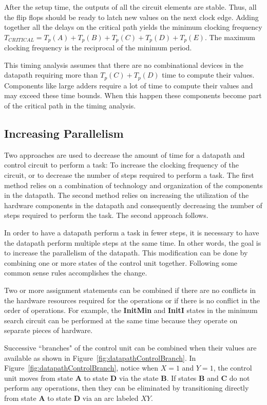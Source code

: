 After the setup time, the outputs of all the circuit elements 
are stable.  Thus, all the flip flops should be ready to latch new 
values on the next clock edge.  Adding together all the
delays on the critical path yields the minimum clocking frequency
$T_{CRITICAL}=T_p(A)+T_p(B)+T_p(C)+T_p(D)+T_p(E)$. The maximum
clocking frequency is the reciprocal of the minimum period.

This timing analysis assumes that there are no combinational devices in 
the datapath requiring more than $T_p(C)+T_p(D)$ time to compute their 
values.  Components like large adders require a lot of time to compute
their values and may exceed these time bounds.  When this happen these 
components become part of the critical path in the timing analysis.

\subsection{Increasing Parallelism}

Two approaches are used to decrease the amount of time for a 
datapath and control circuit to perform a task: To increase 
the clocking frequency of the circuit, or to decrease the number of
steps required to perform a task.  The first method relies on a
combination of technology and organization of the components in 
the datapath.  The second method relies on increasing the utilization 
of the hardware components in the datapath and consequently decreasing
the number of steps required to perform the task.  
The second approach follows.

In order to have a datapath perform a task in fewer steps, it is
necessary to have the datapath perform multiple steps at the 
same time.  In other words, the goal is to increase the
parallelism of the datapath.  This modification can be done by combining
one or more states of the control unit together.   
Following some common sense rules accomplishes the change.

Two or more assignment statements can be combined if there are 
no conflicts in the hardware resources required for the operations
or if there is no conflict in the order of operations.
For example, the \textbf{ InitMin} and \textbf{ InitI} states in the 
minimum search circuit can be performed at the same time because
they operate on separate pieces of hardware.  

Successive ``branches" of the control unit can be combined when
their values are available as shown in Figure~\ref{fig:datapathControlBranch}.  
In Figure~\ref{fig:datapathControlBranch}, notice when $X=1$ and $Y=1$,
the control unit moves from state \textbf{ A} to state \textbf{ D} via the
state \textbf{ B}.  If states \textbf{ B} and \textbf{ C} do not perform any
operations, then they can be eliminated by transitioning directly
from state \textbf{ A} to state \textbf{ D} via an arc labeled $XY$.

